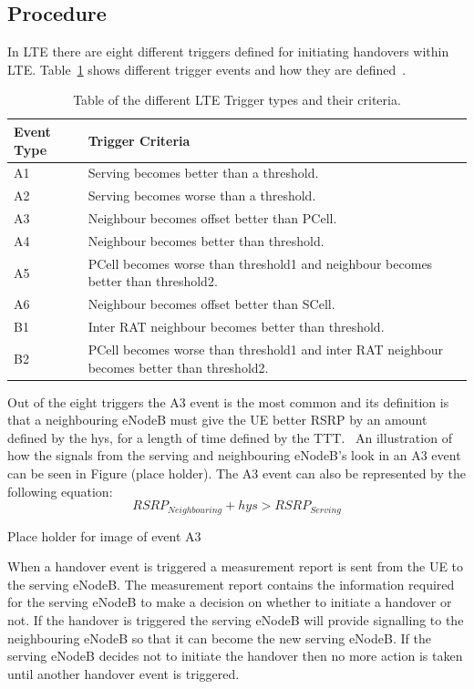 \subsection{Procedure}\label{procedure}
In LTE there are eight different triggers defined for initiating handovers within LTE. Table~\ref{tab:trigger} shows different trigger events and how they are defined~\cite{3gpp2012triggers}. 
\begin{table}[H]
  \begin{center}
    \begin{tabular}{| l | p{11.1cm} |}
  	  \hline
      \textbf{Event Type} & \textbf{Trigger Criteria} \\ \hline
      A1 & Serving becomes better than a threshold. \\
      A2 & Serving becomes worse than a threshold. \\
      A3 & Neighbour becomes offset better than \ac{PCell}. \\
      A4 & Neighbour becomes better than threshold. \\
      A5 & \ac{PCell} becomes worse than threshold1 and neighbour becomes better than threshold2. \\
      A6 & Neighbour becomes offset better than \ac{SCell}. \\
      B1 & Inter RAT neighbour becomes better than threshold. \\
      B2 & \ac{PCell} becomes worse than threshold1 and inter RAT neighbour becomes better than threshold2. \\
      \hline
  	\end{tabular}
  \end{center}
  \caption{Table of the different LTE Trigger types and their criteria.}
  \label{tab:trigger}
\end{table}
Out of the eight triggers the A3 event is the most common and its definition is that a neighbouring eNodeB must give the UE better \ac{RSRP} by an amount defined by the hys, for a length of time defined by the TTT.~\cite{sinclair2013handover} An illustration of how the signals from the serving and neighbouring eNodeB’s look in an A3 event can be seen in Figure (place holder). The A3 event can also be represented by the following equation:
\begin{equation}
RSRP_{Neighbouring} + hys > RSRP_{Serving}
\end{equation}
 
Place holder for image of event A3

When a handover event is triggered a measurement report is sent from the UE to the serving eNodeB. The measurement report contains the information required for the serving eNodeB to make a decision on whether to initiate a handover or not. If the handover is triggered the serving eNodeB will provide signalling to the neighbouring eNodeB so that it can become the new serving eNodeB. If the serving eNodeB decides not to initiate the handover then no more action is taken until another handover event is triggered.

